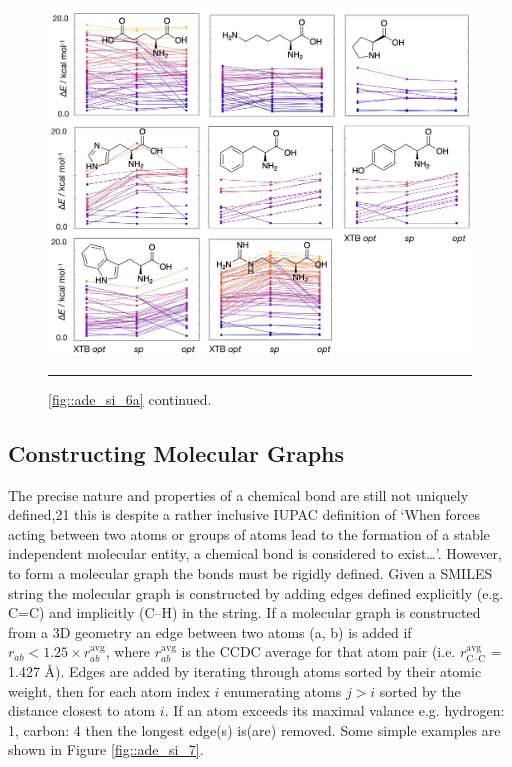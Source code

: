 \documentclass[../../main.tex]{subfiles}
\begin{document}
\begin{figure}[h!]
	\vspace{0.4cm}
	\centering
	\includegraphics[width=\textwidth]{5/autode/figs/figS6b}
	\vspace{0.4cm}
	\hrule
	\caption{\figurename{ }\ref{fig::ade_si_6a} continued.}
	\label{fig::ade_si_6b}
\end{figure}

\clearpage
\subsection{Constructing Molecular Graphs}

The precise nature and properties of a chemical bond are still not uniquely defined,21 this is despite a rather inclusive IUPAC definition of ‘When forces acting between two atoms or groups of atoms lead to the formation of a stable independent molecular entity, a chemical bond is considered to exist…’.\cite{IUPACgoldbook} However, to form a molecular graph the bonds must be rigidly defined. Given a SMILES string the molecular graph is constructed by adding edges defined explicitly (e.g. C=C) and implicitly (C--H) in the string. If a molecular graph is constructed from a 3D geometry an edge between two atoms (a, b) is added if $r_{ab} < 1.25 \times r^\text{avg}_{ab}$, where $r^\text{avg}_{ab}$ is the CCDC average for that atom pair (i.e. $r^\text{avg}_\text{C--C}$ = 1.427 \AA). Edges are added by iterating through atoms sorted by their atomic weight, then for each atom index $i$ enumerating atoms $j > i$ sorted by the distance closest to atom $i$. If an atom exceeds its maximal valance e.g. hydrogen: 1, carbon: 4 then the longest edge(s) is(are) removed. Some simple examples are shown in Figure \ref{fig::ade_si_7}. 
\end{document}
